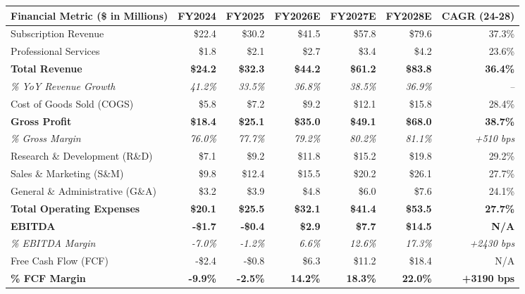 \documentclass[10pt,a4paper]{article}
\begin{document}
\noindent
\begin{tcolorbox}[tablebox]
  \small
  \begin{tabularx}{\textwidth}{X r r r r r r}
    \toprule
    \textbf{\color{NavyPrimary}Financial Metric (\$ in Millions)} & \textbf{FY2024} & \textbf{FY2025} & \textbf{FY2026E} & \textbf{FY2027E} & \textbf{FY2028E} & \textbf{CAGR (24-28)} \\
    \midrule
    Subscription Revenue & \$22.4 & \$30.2 & \$41.5 & \$57.8 & \$79.6 & 37.3\% \\
    Professional Services & \$1.8 & \$2.1 & \$2.7 & \$3.4 & \$4.2 & 23.6\% \\
    \textbf{Total Revenue} & \textbf{\$24.2} & \textbf{\$32.3} & \textbf{\$44.2} & \textbf{\$61.2} & \textbf{\$83.8} & \textbf{36.4\%} \\
    \quad \textit{\% YoY Revenue Growth} & \textit{41.2\%} & \textit{33.5\%} & \textit{36.8\%} & \textit{38.5\%} & \textit{36.9\%} & \textit{--} \\
    \midrule
    Cost of Goods Sold (COGS) & \$5.8 & \$7.2 & \$9.2 & \$12.1 & \$15.8 & 28.4\% \\
    \textbf{Gross Profit} & \textbf{\$18.4} & \textbf{\$25.1} & \textbf{\$35.0} & \textbf{\$49.1} & \textbf{\$68.0} & \textbf{38.7\%} \\
    \quad \textit{\% Gross Margin} & \textit{76.0\%} & \textit{77.7\%} & \textit{79.2\%} & \textit{80.2\%} & \textit{81.1\%} & \textit{+510 bps} \\
    \midrule
    Research \& Development (R\&D) & \$7.1 & \$9.2 & \$11.8 & \$15.2 & \$19.8 & 29.2\% \\
    Sales \& Marketing (S\&M) & \$9.8 & \$12.4 & \$15.5 & \$20.2 & \$26.1 & 27.7\% \\
    General \& Administrative (G\&A) & \$3.2 & \$3.9 & \$4.8 & \$6.0 & \$7.6 & 24.1\% \\
    \textbf{Total Operating Expenses} & \textbf{\$20.1} & \textbf{\$25.5} & \textbf{\$32.1} & \textbf{\$41.4} & \textbf{\$53.5} & \textbf{27.7\%} \\
    \midrule
    \textbf{EBITDA} & \textbf{-\$1.7} & \textbf{-\$0.4} & \textbf{\$2.9} & \textbf{\$7.7} & \textbf{\$14.5} & \textbf{N/A} \\
    \quad \textit{\% EBITDA Margin} & \textit{-7.0\%} & \textit{-1.2\%} & \textit{6.6\%} & \textit{12.6\%} & \textit{17.3\%} & \textit{+2430 bps} \\
    Free Cash Flow (FCF) & -\$2.4 & -\$0.8 & \$6.3 & \$11.2 & \$18.4 & N/A \\
    \textbf{\% FCF Margin} & \textbf{-9.9\%} & \textbf{-2.5\%} & \textbf{14.2\%} & \textbf{18.3\%} & \textbf{22.0\%} & \textbf{+3190 bps} \\
    \bottomrule
  \end{tabularx}
\end{tcolorbox}
\end{document}
